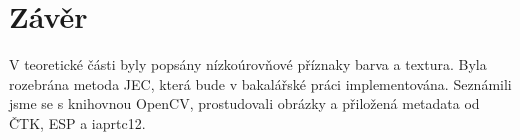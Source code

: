 \documentclass[czech,BP]{thesiskiv}
\begin{document}
\chapter{Závěr}
V teoretické části byly popsány nízkoúrovňové příznaky barva a textura. Byla rozebrána metoda JEC, která bude v bakalářské práci implementována. Seznámili jsme se s knihovnou OpenCV, prostudovali obrázky a přiložená metadata od ČTK, ESP a iaprtc12. 
\end{document}
